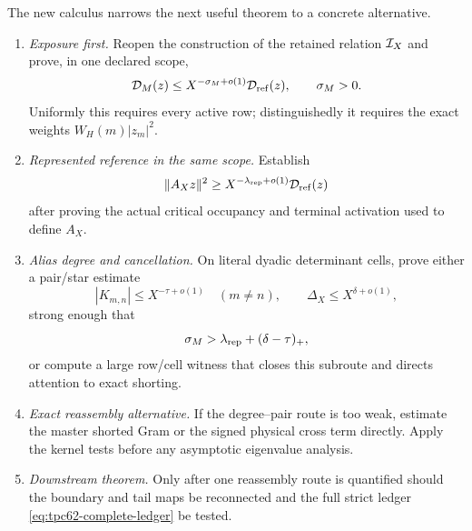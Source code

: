 The new calculus narrows the next useful theorem to a concrete alternative.

\begin{enumerate}[label=\textbf{Route \arabic*.},leftmargin=4.3em]
 \item \emph{Exposure first.}  Reopen the construction of the retained
       relation \(\mathcal I_X\) and prove, in one declared scope,
       \begin{equation}
        \mathcal D_M(z)
        \le X^{-\sigma_M+o(1)}\mathcal D_{\rm ref}(z),
        \qquad \sigma_M>0.
        \label{eq:tpc62-next-exposure-target}
       \end{equation}
       Uniformly this requires every active row; distinguishedly it requires
       the exact weights \(W_H(m)|z_m|^2\).

 \item \emph{Represented reference in the same scope.}  Establish
       \begin{equation}
        \|A_Xz\|^2
        \ge X^{-\lambda_{\rm rep}+o(1)}
             \mathcal D_{\rm ref}(z)
        \label{eq:tpc62-next-represented-target}
       \end{equation}
       after proving the actual critical occupancy and terminal activation
       used to define \(A_X\).

 \item \emph{Alias degree and cancellation.}  On literal dyadic
       determinant cells, prove either a pair/star estimate
       \begin{equation}
        |K_{m,n}|\le X^{-\tau+o(1)}\quad(m\ne n),
        \qquad
        \Delta_X\le X^{\delta+o(1)},
        \label{eq:tpc62-next-alias-target}
       \end{equation}
       strong enough that
       \begin{equation}
        \sigma_M>
        \lambda_{\rm rep}+(\delta-\tau)_+,
        \label{eq:tpc62-next-localized-threshold}
       \end{equation}
       or compute a large row/cell witness that closes this subroute and
       directs attention to exact shorting.

 \item \emph{Exact reassembly alternative.}  If the degree--pair route is
       too weak, estimate the master shorted Gram or the signed physical
       cross term directly.  Apply the kernel tests before any asymptotic
       eigenvalue analysis.

 \item \emph{Downstream theorem.}  Only after one reassembly route is
       quantified should the boundary and tail maps be reconnected and the
       full strict ledger \eqref{eq:tpc62-complete-ledger} be tested.
\end{enumerate}

